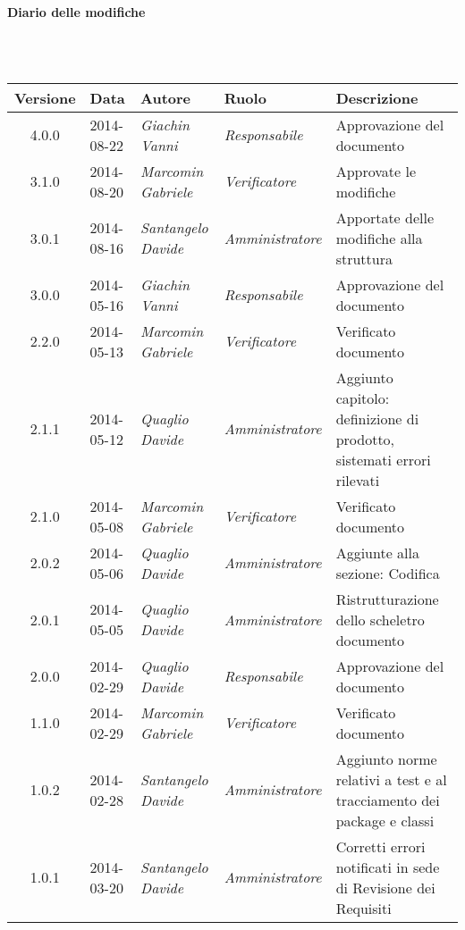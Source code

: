 \noindent\begin{Large}\textbf{Diario delle modifiche}\end{Large}\\
\\
\begin{small}
\begin{tabular}{|c|p{1.8cm}|p{2.8cm}|p{2.8cm}|p{3.5cm}|}
\hline
Versione & Data & Autore & Ruolo & Descrizione \\
\hline
4.0.0 & 2014-08-22 & 
\textit{Giachin Vanni} &
\textit{Responsabile} & Approvazione del documento\\
\hline
3.1.0 & 2014-08-20 & 
\textit{Marcomin Gabriele} &
\textit{Verificatore} & Approvate le modifiche\\
\hline
3.0.1 & 2014-08-16 & 
\textit{Santangelo Davide} &
\textit{Amministratore} & Apportate delle modifiche alla struttura\\
\hline
3.0.0 & 2014-05-16 & 
\textit{Giachin Vanni} &
\textit{Responsabile} & Approvazione del documento\\
\hline
2.2.0 & 2014-05-13 & 
\textit{Marcomin Gabriele} &
\textit{Verificatore} & Verificato documento\\
\hline
2.1.1 & 2014-05-12 & 
\textit{Quaglio Davide} &
\textit{Amministratore} & Aggiunto capitolo: definizione di prodotto, sistemati errori rilevati\\
\hline
2.1.0 & 2014-05-08 & 
\textit{Marcomin Gabriele} &
\textit{Verificatore} & Verificato documento\\
\hline
2.0.2 & 2014-05-06 & 
\textit{Quaglio Davide} &
\textit{Amministratore} & Aggiunte alla sezione: Codifica\\
\hline
2.0.1 & 2014-05-05 & 
\textit{Quaglio Davide} &
\textit{Amministratore} & Ristrutturazione dello scheletro documento\\
\hline
2.0.0 & 2014-02-29 & 
\textit{Quaglio Davide} &
\textit{Responsabile} & Approvazione del documento\\
\hline
1.1.0 & 2014-02-29 & 
\textit{Marcomin Gabriele} &
\textit{Verificatore} & Verificato documento\\
\hline
1.0.2 & 2014-02-28 & 
\textit{Santangelo Davide} &
\textit{Amministratore} &  Aggiunto norme relativi a test e al tracciamento dei package e classi\\
\hline
1.0.1 & 2014-03-20 & 
\textit{Santangelo Davide} &
\textit{Amministratore} &  Corretti errori notificati in sede di Revisione dei Requisiti\\

\end{tabular}
\end{small}
